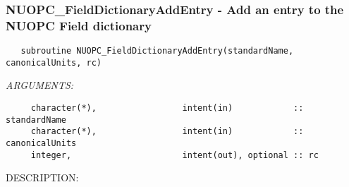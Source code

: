  
\setlength{\oldparskip}{\parskip}
\setlength{\parskip}{1.5ex}
\setlength{\oldparindent}{\parindent}
\setlength{\parindent}{0pt}
\setlength{\oldbaselineskip}{\baselineskip}
\setlength{\baselineskip}{11pt}
 
\def\bv{\begin{verbatim}}
\def\ev{\end{verbatim}}
\def\be{\begin{equation}}
\def\ee{\end{equation}}
\def\bea{\begin{eqnarray}}
\def\eea{\end{eqnarray}}
\def\bi{\begin{itemize}}
\def\ei{\end{itemize}}
\def\bn{\begin{enumerate}}
\def\en{\end{enumerate}}
\def\bd{\begin{description}}
\def\ed{\end{description}}
\def\({\left (}
\def\){\right )}
\def\[{\left [}
\def\]{\right ]}
\def\<{\left  \langle}
\def\>{\right \rangle}
\def\cI{{\cal I}}
\def\diag{\mathop{\rm diag}}
\def\tr{\mathop{\rm tr}}


 
\subsubsection [NUOPC\_FieldDictionaryAddEntry] {NUOPC\_FieldDictionaryAddEntry - Add an entry to the NUOPC Field dictionary}


\begin{verbatim}   subroutine NUOPC_FieldDictionaryAddEntry(standardName, canonicalUnits, rc)\end{verbatim}{\em ARGUMENTS:}
\begin{verbatim}     character(*),                 intent(in)            :: standardName
     character(*),                 intent(in)            :: canonicalUnits
     integer,                      intent(out), optional :: rc\end{verbatim}
{\sf DESCRIPTION:\\ }


